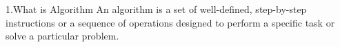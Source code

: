 1.What is Algorithm
An algorithm is a set of well-defined, step-by-step instructions or a sequence of 
operations designed to perform a specific task or solve a particular problem.